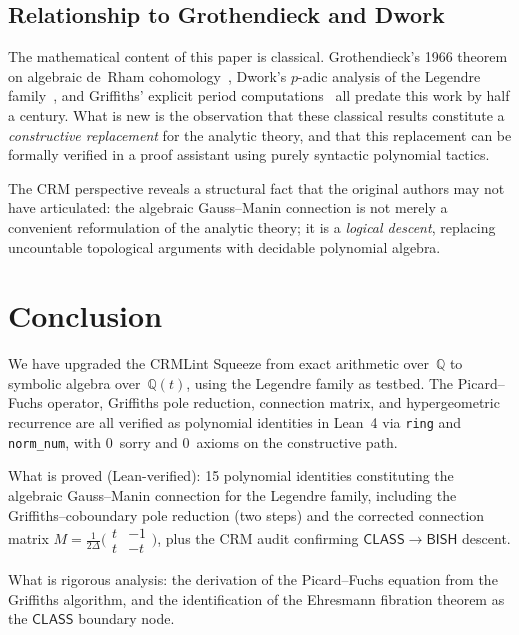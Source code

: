 \documentclass[11pt]{article}
\theoremstyle{plain}
\theoremstyle{definition}
\theoremstyle{remark}
\newcommand{\Q}{\mathbb{Q}}
\newcommand{\BISH}{\mathsf{BISH}}
\newcommand{\CLASS}{\mathsf{CLASS}}
\begin{document}
\subsection{Relationship to Grothendieck and Dwork}

The mathematical content of this paper is classical.  Grothendieck's
1966 theorem on algebraic de~Rham cohomology~\cite{Grothendieck1966},
Dwork's $p$-adic analysis of the Legendre family~\cite{Dwork1962},
and Griffiths' explicit period
computations~\cite{Griffiths1969} all predate this work by half
a century.  What is new is the observation that these classical
results constitute a \emph{constructive replacement} for the
analytic theory, and that this replacement can be formally verified
in a proof assistant using purely syntactic polynomial tactics.

The CRM perspective reveals a structural fact that the original
authors may not have articulated: the algebraic Gauss--Manin
connection is not merely a convenient reformulation of the analytic
theory; it is a \emph{logical descent}, replacing uncountable
topological arguments with decidable polynomial algebra.

\section{Conclusion}\label{sec:conclusion}

We have upgraded the CRMLint Squeeze from exact arithmetic
over~$\Q$ to symbolic algebra over~$\Q(t)$, using the Legendre
family as testbed.  The Picard--Fuchs operator, Griffiths pole
reduction, connection matrix, and hypergeometric recurrence are
all verified as polynomial identities in Lean~4 via \texttt{ring}
and \texttt{norm\_num}, with 0~sorry and 0~axioms on the
constructive path.

What is proved (Lean-verified): 15 polynomial identities constituting
the algebraic Gauss--Manin connection for the Legendre family,
including the Griffiths--coboundary pole reduction (two steps) and
the corrected connection matrix $M = \frac{1}{2\Delta}\bigl(\begin{smallmatrix}t & -1\\t & -t\end{smallmatrix}\bigr)$,
plus the CRM audit confirming $\CLASS \to \BISH$ descent.

What is rigorous analysis: the derivation of the Picard--Fuchs
equation from the Griffiths algorithm, and the identification of
the Ehresmann fibration theorem as the $\CLASS$ boundary node.
\end{document}
